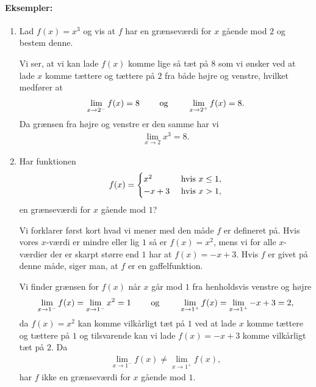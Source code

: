 \paragraph*{Eksempler:}
\begin{enumerate}
\item Lad $f(x)=x^3$ og vis at $f$ har en grænseværdi for $x$ gående mod $2$ og bestem denne.

Vi ser, at vi kan lade $f(x)$ komme lige så tæt på $8$ som vi ønsker ved at lade $x$ komme tættere og tættere på $2$ fra både højre og venstre, hvilket medfører at
\begin{align*}
\lim_{x \to 2^-} f(x) = 8 \qquad \textup{ og } \qquad \lim_{x \to 2^+} f(x) = 8.
\end{align*}
Da grænsen fra højre og venstre er den samme har vi 
\begin{align*}
\lim_{x \to 2} x^3=8.
\end{align*}
\item Har funktionen
\begin{align*}
f (x) = 
\begin{cases}
x^2 & \textup{ hvis } x \leq 1, \\
-x+3 & \textup{ hvis } x > 1,
\end{cases}
\end{align*}
en grænseværdi for $x$ gående mod $1$?

Vi forklarer først kort hvad vi mener med den måde $f$ er defineret på. Hvis vores $x$-værdi er mindre eller lig $1$ så er $f(x)=x^2$, mens vi for alle $x$-værdier der er skarpt større end $1$ har at $f(x)=-x+3$. Hvis $f$ er givet på denne måde, siger man, at $f$ er en gaffelfunktion.

Vi finder grænsen for $f(x)$ når $x$ går mod $1$ fra henholdsvis venstre og højre
\begin{align*}
\lim_{x \to 1^-} f(x) = \lim_{x \to 1^-} x^2 = 1 \qquad \textup{ og } \qquad \lim_{x \to 1^+} f(x)= \lim_{x \to 1^+} -x+3 = 2, 
\end{align*} 
da $f(x)=x^2$ kan komme vilkårligt tæt på $1$ ved at lade $x$ komme tættere og tættere på $1$ og tilsvarende kan vi lade $f(x)=-x+3$ komme vilkårligt tæt på $2$. Da
\begin{align*}
\lim_{x \to 1^-} f(x) \neq \lim_{x \to 1^+} f(x),
\end{align*}
har $f$ ikke en grænseværdi for $x$ gående mod $1$.
\end{enumerate}
